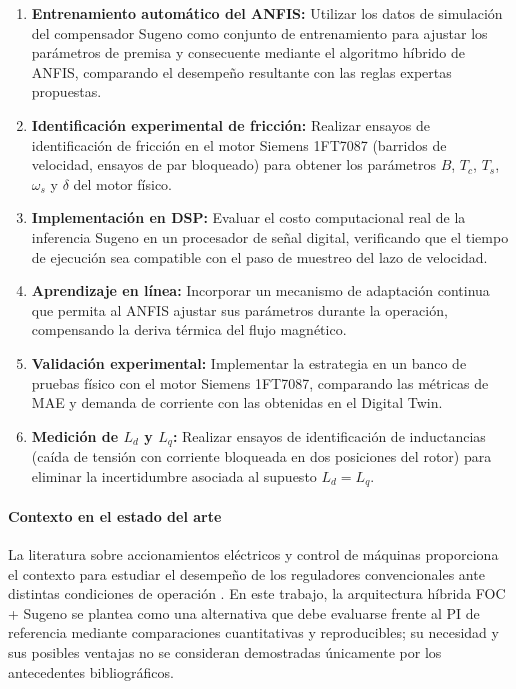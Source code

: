 \begin{enumerate}
\item \textbf{Entrenamiento automático del ANFIS:} Utilizar los datos de simulación del compensador Sugeno como conjunto de entrenamiento para ajustar los parámetros de premisa y consecuente mediante el algoritmo híbrido de ANFIS, comparando el desempeño resultante con las reglas expertas propuestas.

\item \textbf{Identificación experimental de fricción:} Realizar ensayos de identificación de fricción en el motor Siemens 1FT7087 (barridos de velocidad, ensayos de par bloqueado) para obtener los parámetros $B$, $T_c$, $T_s$, $\omega_s$ y $\delta$ del motor físico.

\item \textbf{Implementación en DSP:} Evaluar el costo computacional real de la inferencia Sugeno en un procesador de señal digital, verificando que el tiempo de ejecución sea compatible con el paso de muestreo del lazo de velocidad.

\item \textbf{Aprendizaje en línea:} Incorporar un mecanismo de adaptación continua que permita al ANFIS ajustar sus parámetros durante la operación, compensando la deriva térmica del flujo magnético.

\item \textbf{Validación experimental:} Implementar la estrategia en un banco de pruebas físico con el motor Siemens 1FT7087, comparando las métricas de MAE y demanda de corriente con las obtenidas en el Digital Twin.

\item \textbf{Medición de $L_d$ y $L_q$:} Realizar ensayos de identificación de inductancias (caída de tensión con corriente bloqueada en dos posiciones del rotor) para eliminar la incertidumbre asociada al supuesto $L_d = L_q$.
\end{enumerate}

\paragraph{Contexto en el estado del arte}
La literatura sobre accionamientos eléctricos y control de máquinas proporciona el contexto para estudiar el desempeño de los reguladores convencionales ante distintas condiciones de operación \cite{holtz2002sensorless, krishnan2017permanent}. En este trabajo, la arquitectura híbrida FOC + Sugeno se plantea como una alternativa que debe evaluarse frente al PI de referencia mediante comparaciones cuantitativas y reproducibles; su necesidad y sus posibles ventajas no se consideran demostradas únicamente por los antecedentes bibliográficos.
